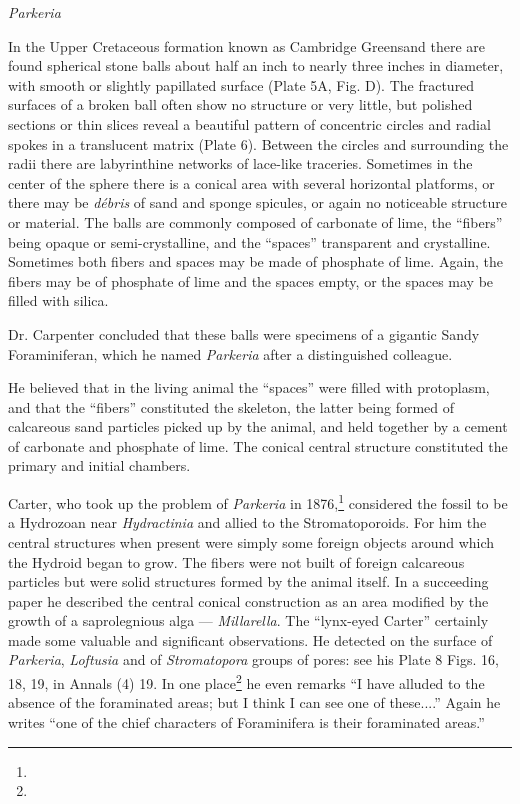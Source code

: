 \documentclass[a4paper, 12pt, oneside]{article}
\begin{document}
\bigskip
\centerline{\emph{Parkeria}}

In the Upper Cretaceous formation known as Cambridge Greensand there are found spherical stone balls about half an inch to nearly three inches in diameter, with smooth or slightly papillated surface (Plate 5A, Fig. D). The fractured surfaces of a broken ball often show no structure or very little, but polished sections or thin slices reveal a beautiful pattern of concentric circles and radial spokes in a translucent matrix (Plate 6). Between the circles and surrounding the radii there are labyrinthine networks of lace-like traceries. Sometimes in the center of the sphere there is a conical area with several horizontal platforms, or there may be \emph{débris} of sand and sponge spicules, or again no noticeable structure or material. The balls are commonly composed of carbonate of lime, the ``fibers'' being opaque or semi-crystalline, and the ``spaces'' transparent and crystalline. Sometimes both fibers and spaces may be made of phosphate of lime. Again, the fibers may be of phosphate of lime and the spaces empty, or the spaces may be filled with silica.

Dr. Carpenter concluded that these balls were specimens of a gigantic Sandy Foraminiferan, which he named \emph{Parkeria} after a distinguished colleague.

He believed that in the living animal the ``spaces'' were filled with protoplasm, and that the ``fibers'' constituted the skeleton, the latter being formed of calcareous sand particles picked up by the animal, and held together by a cement of carbonate and phosphate of lime. The conical central structure constituted the primary and initial chambers.

Carter, who took up the problem of \emph{Parkeria} in 1876,\footnote{} considered the fossil to be a Hydrozoan near \emph{Hydractinia} and allied to the Stromatoporoids. For him the central structures when present were simply some foreign objects around which the Hydroid began to grow. The fibers were not built of foreign calcareous particles but were solid structures formed by the animal itself. In a succeeding paper he described the central conical construction as an area modified by the growth of a saprolegnious alga --- \emph{Millarella}. The ``lynx-eyed Carter'' certainly made some valuable and significant observations. He detected on the surface of \emph{Parkeria}, \emph{Loftusia} and of \emph{Stromatopora} groups of pores: see his Plate 8 Figs. 16, 18, 19, in Annals (4) 19. In one place\footnote{} he even remarks ``I have alluded to the absence of the foraminated areas; but I think I can see one of these....'' Again he writes ``one of the chief characters of Foraminifera is their foraminated areas.''
\end{document}
